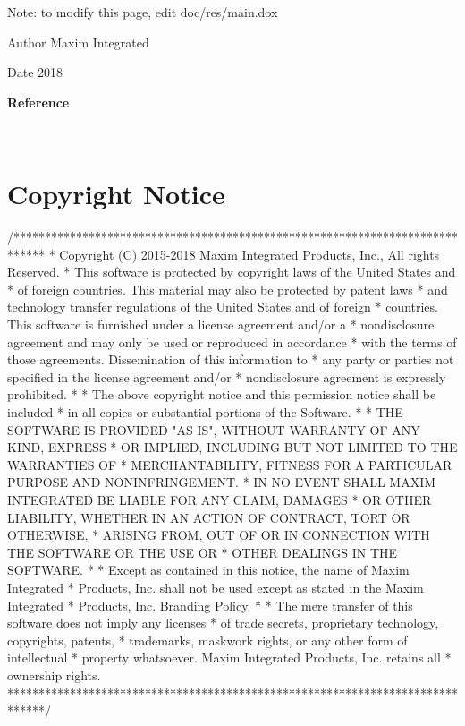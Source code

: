 Note\+: to modify this page, edit doc/res/main.\+dox

\begin{DoxyAuthor}{Author}
Maxim Integrated 
\end{DoxyAuthor}
\begin{DoxyDate}{Date}
2018
\end{DoxyDate}
{\bfseries Reference}

~~~~~~~~\hypertarget{index_s2}{}\section{Copyright Notice}\label{index_s2}

\begin{DoxyCode}
\textcolor{comment}{/*****************************************************************************}
\textcolor{comment}{* Copyright (C) 2015-2018 Maxim Integrated Products, Inc., All rights Reserved.}
\textcolor{comment}{* This software is protected by copyright laws of the United States and}
\textcolor{comment}{* of foreign countries. This material may also be protected by patent laws}
\textcolor{comment}{* and technology transfer regulations of the United States and of foreign}
\textcolor{comment}{* countries. This software is furnished under a license agreement and/or a}
\textcolor{comment}{* nondisclosure agreement and may only be used or reproduced in accordance}
\textcolor{comment}{* with the terms of those agreements. Dissemination of this information to}
\textcolor{comment}{* any party or parties not specified in the license agreement and/or}
\textcolor{comment}{* nondisclosure agreement is expressly prohibited.}
\textcolor{comment}{*}
\textcolor{comment}{* The above copyright notice and this permission notice shall be included}
\textcolor{comment}{* in all copies or substantial portions of the Software.}
\textcolor{comment}{*}
\textcolor{comment}{* THE SOFTWARE IS PROVIDED "AS IS", WITHOUT WARRANTY OF ANY KIND, EXPRESS}
\textcolor{comment}{* OR IMPLIED, INCLUDING BUT NOT LIMITED TO THE WARRANTIES OF}
\textcolor{comment}{* MERCHANTABILITY, FITNESS FOR A PARTICULAR PURPOSE AND NONINFRINGEMENT.}
\textcolor{comment}{* IN NO EVENT SHALL MAXIM INTEGRATED BE LIABLE FOR ANY CLAIM, DAMAGES}
\textcolor{comment}{* OR OTHER LIABILITY, WHETHER IN AN ACTION OF CONTRACT, TORT OR OTHERWISE,}
\textcolor{comment}{* ARISING FROM, OUT OF OR IN CONNECTION WITH THE SOFTWARE OR THE USE OR}
\textcolor{comment}{* OTHER DEALINGS IN THE SOFTWARE.}
\textcolor{comment}{*}
\textcolor{comment}{* Except as contained in this notice, the name of Maxim Integrated}
\textcolor{comment}{* Products, Inc. shall not be used except as stated in the Maxim Integrated}
\textcolor{comment}{* Products, Inc. Branding Policy.}
\textcolor{comment}{*}
\textcolor{comment}{* The mere transfer of this software does not imply any licenses}
\textcolor{comment}{* of trade secrets, proprietary technology, copyrights, patents,}
\textcolor{comment}{* trademarks, maskwork rights, or any other form of intellectual}
\textcolor{comment}{* property whatsoever. Maxim Integrated Products, Inc. retains all}
\textcolor{comment}{* ownership rights.}
\textcolor{comment}{******************************************************************************/}
\end{DoxyCode}
